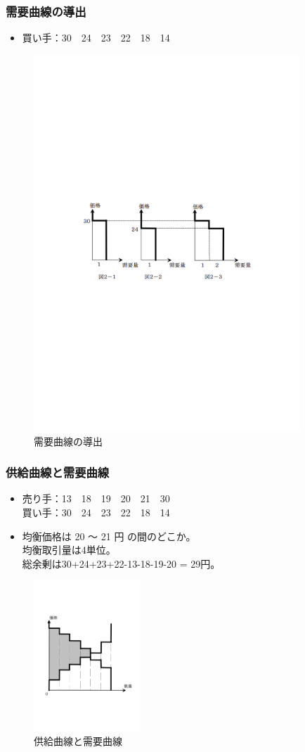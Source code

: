 \documentclass[dvipdfmx,12pt]{beamer}
\begin{document}
\begin{frame}
\frametitle{需要曲線の導出}
\begin{itemize}\setlength{\parskip}{0.5em}
\item
買い手：30　24　23　22　18　14
\end{itemize}
\begin{figure}
\centering
\includegraphics[width=100mm]{demand.pdf}
\caption{需要曲線の導出}
\label{fig:demand}
\end{figure}
\end{frame}

\begin{frame}
\frametitle{供給曲線と需要曲線}
\begin{itemize}\setlength{\parskip}{0.5em}
\item
売り手：13　18　19　20　21　30\\
買い手：30　24　23　22　18　14
\item
均衡価格は 20 〜 21 円 の間のどこか。\\
均衡取引量は4単位。\\
総余剰は30+24+23+22-13-18-19-20 = 29円。
\end{itemize}
\begin{figure}
\centering
\includegraphics[width=40mm]{price.pdf}
\caption{供給曲線と需要曲線}
\label{fig:price}
\end{figure}
\end{frame}
\end{document}
